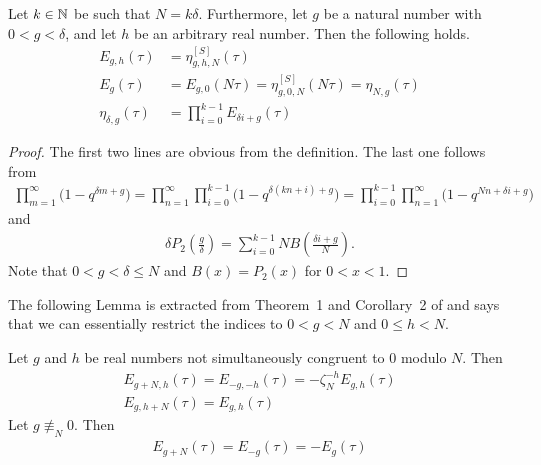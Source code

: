 \documentclass{article}
\begin{document}
\begin{Hemmecke}
\begin{Lemma}\label{thm:E-g-h-Schoeneberg}
  Let $k\in\mathbb{N}$ be such that $N=k \delta$. Furthermore, let $g$ be a
  natural number with $0 < g < \delta$, and let $h$ be an arbitrary
  real number. Then the following holds.
  \begin{align*}
    E_{g,h}(\tau) &= \eta_{g,h,N}^{[S]}(\tau)
    \\
    E_g(\tau)
    &=
      E_{g,0}(N \tau)
      =
      \eta_{g,0,N}^{[S]}(N \tau)
      =
      \eta_{N,g}(\tau)
    \\
    \eta_{\delta,g}(\tau)
    &=
    \prod_{i=0}^{k-1} E_{\delta i + g}(\tau)
  \end{align*}
\end{Lemma}
\begin{proof}
  The first two lines are obvious from the definition.
  The last one follows from
  \begin{gather*}
    \prod_{m=1}^\infty \bigl(1-q^{\delta m + g}\bigr) =
    \prod_{n=1}^\infty \prod_{i=0}^{k-1} \bigl(1-q^{\delta (k n + i) + g}\bigr) =
    \prod_{i=0}^{k-1} \prod_{n=1}^\infty \bigl(1-q^{N n + \delta i + g}\bigr)
  \end{gather*}
  and
  \begin{gather*}
    \delta P_2\left(\frac{g}{\delta}\right)
    =
    \sum_{i=0}^{k-1}N B\left(\frac{\delta i + g}{N}\right).
  \end{gather*}
  Note that $0<g<\delta \le N$ and $B(x)=P_2(x)$ for $0<x<1$.
\end{proof}

The following Lemma is extracted from Theorem~1 and Corollary~2 of
\cite{Yang_GeneralizedDedekindEtaFunctions_2004} and says that we can
essentially restrict the indices to $0<g<N$ and $0\le h<N$.


\begin{Lemma}[Yang]
  \label{thm:modular-Yang-E}
  Let $g$ and $h$ be real numbers not simultaneously congruent to 0
  modulo $N$. Then
  \begin{gather*}
    E_{g+N,h}(\tau) = E_{-g,-h}(\tau) = -\zeta_N^{-h} E_{g,h}(\tau)\\
    E_{g,h+N}(\tau) = E_{g, h}(\tau)
  \end{gather*}
  Let $g \not\equiv_N 0$. Then
  \begin{gather*}
    E_{g+N}(\tau) = E_{-g}(\tau) = - E_g(\tau)
  \end{gather*}
\end{Lemma}


\end{Hemmecke}
\end{document}
